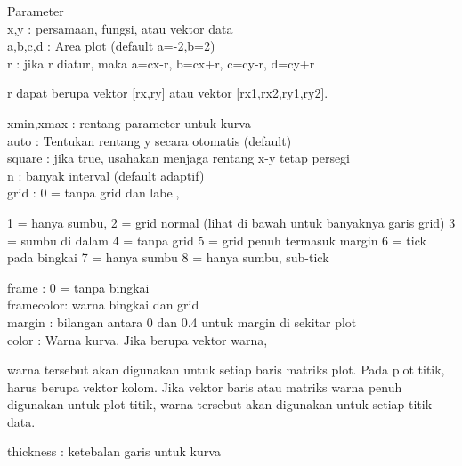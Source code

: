 \documentclass[a4paper,10pt]{article}
\begin{document}
\begin{eulernotebook}
\begin{eulercomment}
\begin{eulercomment}
\begin{eulercomment}
\begin{eulercomment}
\begin{eulercomment}
\begin{eulercomment}
\begin{eulercomment}
Parameter
\\
x,y       : persamaan, fungsi, atau vektor data\\
a,b,c,d   : Area plot (default a=-2,b=2)\\
r         : jika r diatur, maka a=cx-r, b=cx+r, c=cy-r, d=cy+r\\
\end{eulercomment}
\begin{eulerttcomment}
            r dapat berupa vektor [rx,ry] atau vektor [rx1,rx2,ry1,ry2].
\end{eulerttcomment}
\begin{eulercomment}
xmin,xmax : rentang parameter untuk kurva\\
auto      : Tentukan rentang y secara otomatis (default)\\
square    : jika true, usahakan menjaga rentang x-y tetap persegi\\
n         : banyak interval (default adaptif)\\
grid      : 0 = tanpa grid dan label,\\
\end{eulercomment}
\begin{eulerttcomment}
            1 = hanya sumbu,
            2 = grid normal (lihat di bawah untuk banyaknya garis grid)
            3 = sumbu di dalam
            4 = tanpa grid
            5 = grid penuh termasuk margin
            6 = tick pada bingkai
            7 = hanya sumbu
            8 = hanya sumbu, sub-tick
\end{eulerttcomment}
\begin{eulercomment}
frame     : 0 = tanpa bingkai\\
framecolor: warna bingkai dan grid\\
margin    : bilangan antara 0 dan 0.4 untuk margin di sekitar plot\\
color     : Warna kurva. Jika berupa vektor warna,\\
\end{eulercomment}
\begin{eulerttcomment}
            warna tersebut akan digunakan untuk setiap baris matriks plot. Pada
            plot titik, harus berupa vektor kolom. Jika vektor baris atau
            matriks warna penuh digunakan untuk plot titik, warna tersebut akan
            digunakan untuk setiap titik data.
\end{eulerttcomment}
\begin{eulercomment}
thickness : ketebalan garis untuk kurva\\

\end{eulercomment}
\end{eulercomment}
\end{eulercomment}
\end{eulercomment}
\end{eulercomment}
\end{eulercomment}
\end{eulercomment}
\end{eulernotebook}
\end{document}
